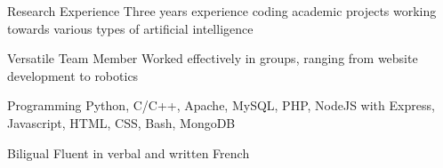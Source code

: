 


\begin{cvskills}


\cvskill
{Research Experience} %
{Three years experience coding academic projects working towards various types of artificial intelligence} %

\cvskill
{Versatile Team Member} %
{Worked effectively in groups, ranging from website development to robotics} %


\cvskill
{Programming} %
{Python, C/C++, Apache, MySQL, PHP, NodeJS with Express, Javascript, HTML, CSS, Bash, MongoDB} %


\cvskill
{Biligual} %
{Fluent in verbal and written French} %


\end{cvskills}
\addvspace{2ex}
